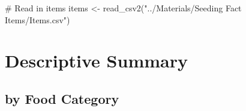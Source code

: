 \documentclass[
  letterpaper,
  DIV=11,
  numbers=noendperiod]{scrartcl}
\newenvironment{Shaded}{\begin{snugshade}}{\end{snugshade}}
\newcommand{\CommentTok}[1]{\textcolor[rgb]{0.37,0.37,0.37}{#1}}
\newcommand{\FunctionTok}[1]{\textcolor[rgb]{0.28,0.35,0.67}{#1}}
\newcommand{\NormalTok}[1]{\textcolor[rgb]{0.00,0.23,0.31}{#1}}
\newcommand{\OtherTok}[1]{\textcolor[rgb]{0.00,0.23,0.31}{#1}}
\newcommand{\StringTok}[1]{\textcolor[rgb]{0.13,0.47,0.30}{#1}}
\begin{document}
\begin{Shaded}
\begin{Highlighting}[]
\CommentTok{\# Read in items}
\NormalTok{items }\OtherTok{\textless{}{-}} \FunctionTok{read\_csv2}\NormalTok{(}\StringTok{"../Materials/Seeding Fact Items/Items.csv"}\NormalTok{)}
\end{Highlighting}
\end{Shaded}

\section{Descriptive Summary}\label{descriptive-summary}

\subsection{by Food Category}\label{by-food-category}
\end{document}
